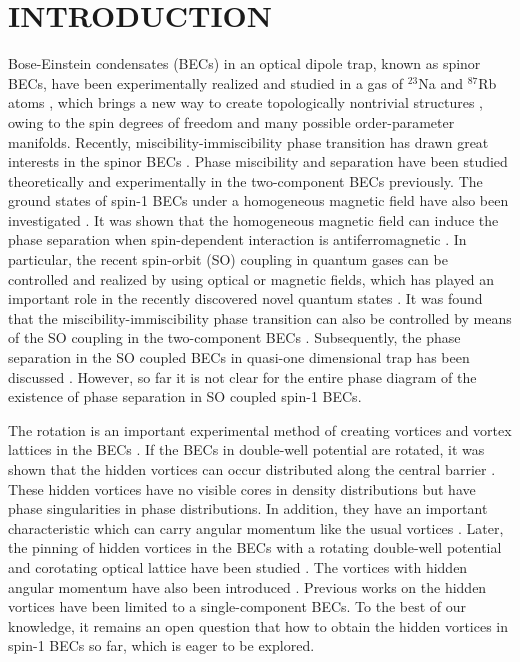 \documentclass[aps,pra,showpacs,twocolumn,superscriptaddress]{revtex4-1}
\begin{document}
\section{INTRODUCTION}
Bose-Einstein condensates (BECs) in an optical dipole trap, known as spinor BECs, have been experimentally
realized and studied in a gas of $^{23}$Na and $^{87}$Rb atoms \cite{Stamper-Kurn1998,Barrett2001}, which brings
a new way to create topologically nontrivial structures \cite{Sadler2006,Ji2008,Khawaja2001,Choi2012,Kawaguchi2008,Hall2016,Ray2014}, owing to the
spin degrees of freedom and many possible order-parameter manifolds. Recently, miscibility-immiscibility
phase transition has drawn great interests in the spinor BECs \cite{Ho1996,Pu1998,Sabbatini2011,Zhou2008,Xi2011,Bandyopadhyay2017,Myatt1997,Matuszewski2009,Matuszewski2010,ocki2012}. Phase miscibility and separation have
been studied theoretically \cite{Ho1996,Pu1998,Sabbatini2011,Zhou2008,Xi2011,Bandyopadhyay2017} and experimentally \cite{Myatt1997} in the two-component BECs previously. The ground states of spin-1 BECs under a homogeneous magnetic field have also been investigated \cite{Matuszewski2009,Matuszewski2010,ocki2012}. It was shown that the
homogeneous magnetic field can induce the phase separation when spin-dependent interaction is antiferromagnetic \cite{Matuszewski2009,Matuszewski2010}. In particular, the recent spin-orbit (SO) coupling in quantum gases can be controlled and realized by using optical or magnetic fields,
which has played an important role in the recently discovered novel quantum states \cite{Lin2011,Wu2016,Huang2016,Wang2010,Su2012,Liu2012,Xu2011,Sinha2011,Hu2012,Gopalakrishnan2013,Li2013,Han2015,Li2017}. It was found that the miscibility-immiscibility phase transition can also be controlled by means of the SO coupling in the two-component BECs \cite{Lin2011}. Subsequently, the phase separation in the SO coupled BECs in quasi-one dimensional trap has been discussed \cite{Gautam2014}. However, so far it is not clear for the entire phase diagram of the existence of phase separation in SO coupled spin-1 BECs.

The rotation is an important experimental method of creating vortices and vortex lattices in the BECs \cite{Raman2001,Schweikhard2004,Williams2010,Martikainen2002,Mizushima2004}.
If the BECs in double-well potential are rotated, it was shown that the hidden vortices can occur distributed along
the central barrier \cite{Wen2010}. These hidden vortices have no visible cores in density
distributions but have phase singularities in phase distributions. In addition, they have an important characteristic
which can carry angular momentum like the usual vortices \cite{Wen2010}. Later, the pinning of hidden vortices in the BECs with a rotating double-well
potential and corotating optical lattice have been studied \cite{Mithun2014}. The vortices with hidden angular momentum have also been introduced \cite{Weiner2017}. Previous works on the hidden vortices have been limited to a single-component BECs. To the best of our
knowledge, it remains an open question that how to obtain the hidden vortices in spin-1 BECs so far, which is eager to be
explored.
\end{document}
